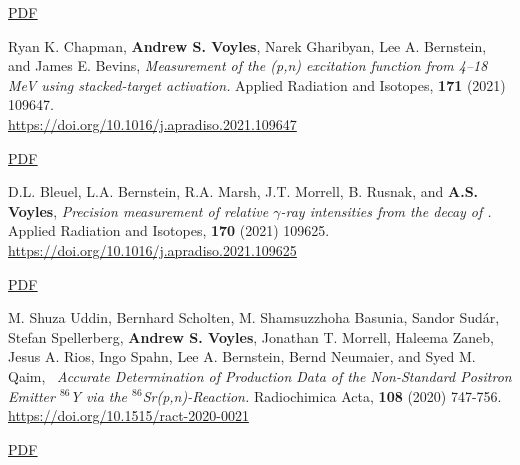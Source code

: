 \begin{bibsection}
\ifshort \vspace{0.1cm} \href{https://avoyles.github.io/papers/Fox2021_Nb.pdf}{\underline{PDF}} \else  \fi 


\item Ryan K. Chapman, \textbf{Andrew S. Voyles}, Narek Gharibyan, Lee A. Bernstein, and
James E. Bevins, \emph{Measurement of the (p,n) excitation function from 4--18 MeV using stacked-target activation.} Applied Radiation and Isotopes, \textbf{171} (2021) 109647. \\ \url{https://doi.org/10.1016/j.apradiso.2021.109647} 

\ifshort \vspace{0.1cm} \href{https://avoyles.github.io/papers/Chapman2021_160Tb.pdf}{\underline{PDF}} \else  \fi 


\item D.L. Bleuel, L.A. Bernstein, R.A. Marsh, J.T. Morrell, B. Rusnak, and \textbf{A.S. Voyles},  \emph{Precision measurement of relative $\gamma$-ray intensities from the decay of .} Applied Radiation and Isotopes, \textbf{170} (2021) 109625. \url{https://doi.org/10.1016/j.apradiso.2021.109625} 

\ifshort \vspace{0.1cm} \href{https://avoyles.github.io/papers/Bleuel2021_61Cu.pdf}{\underline{PDF}} \else  \fi 


\item M. Shuza Uddin, Bernhard Scholten, M. Shamsuzzhoha Basunia, Sandor Sudár, Stefan Spellerberg, \textbf{Andrew S. Voyles}, Jonathan T. Morrell, Haleema Zaneb, Jesus A. Rios, Ingo Spahn, Lee A. Bernstein, Bernd Neumaier, and Syed M. Qaim, \ \emph{Accurate Determination of Production Data of the Non-Standard Positron Emitter $^{86}$Y via the $^{86}$Sr(p,n)-Reaction.} Radiochimica Acta, \textbf{108} (2020) 747-756. \url{https://doi.org/10.1515/ract-2020-0021} 

\ifshort \vspace{0.1cm} \href{https://avoyles.github.io/papers/Uddin2020_86Y.pdf}{\underline{PDF}} \else  \fi 


\end{bibsection}
